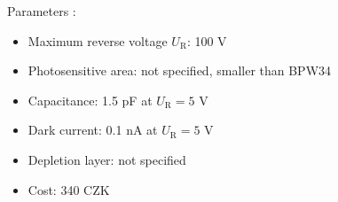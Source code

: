 Parameters \cite{datOPF430}:
\begin{itemize}
\item Maximum reverse voltage $U_\textrm{R}$: 100 V
\item Photosensitive area: not specified, smaller than BPW34
\item Capacitance: 1.5  pF at $U_\textrm{R} = 5$ V
\item Dark current: 0.1 nA at $U_\textrm{R} = 5$ V
\item Depletion layer: not specified
\item Cost: 340 CZK
\end{itemize}

% 
